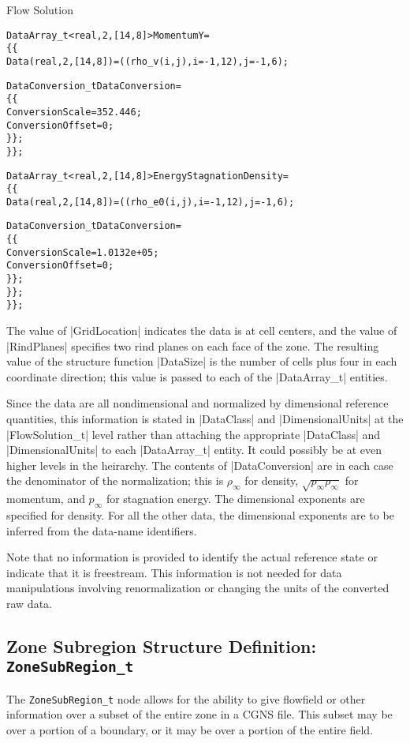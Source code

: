 \begin{example}{Flow Solution}
\begin{alltt}
    DataArray\_t<real, 2, [14,8]> MomentumY =
      \{\{
      Data(real, 2, [14,8]) = ((rho\_v(i,j), i=-1,12), j=-1,6) ;

      DataConversion\_t DataConversion =
        \{\{
        ConversionScale  = 352.446 ;
        ConversionOffset = 0 ;
        \}\} ;
      \}\} ;

    DataArray\_t<real, 2, [14,8]> EnergyStagnationDensity =
      \{\{
      Data(real, 2, [14,8]) = ((rho\_e0(i,j), i=-1,12), j=-1,6) ;

      DataConversion\_t DataConversion =
        \{\{
        ConversionScale  = 1.0132e+05 ;
        ConversionOffset = 0 ;
        \}\} ;
      \}\} ;
    \}\} ;
\end{alltt}
The value of |GridLocation| indicates the data is at cell centers, and the
value of |RindPlanes| specifies two rind planes on each face of the zone.
The resulting value of the structure function |DataSize| is the number of
cells plus four in each coordinate direction; this value is passed to each
of the |DataArray_t| entities.

Since the data are all nondimensional and normalized by dimensional
reference quantities, this information is stated in |DataClass| and 
|DimensionalUnits| at the |FlowSolution_t| level rather than attaching
the appropriate |DataClass| and |DimensionalUnits| to each |DataArray_t|
entity.
It could possibly be at even higher levels in the heirarchy.
The contents of |DataConversion| are in each case the denominator of the
normalization; this is $\rho_\infty$ for density,
$\sqrt{p_\infty \rho_\infty}$ for momentum, and $p_\infty$ for
stagnation energy.
The dimensional exponents are specified for density.
For all the other data, the dimensional exponents are to be inferred from
the data-name identifiers.

Note that no information is provided to identify the actual reference
state or indicate that it is freestream.  This information is not needed
for data manipulations involving renormalization or changing the units
of the converted raw data.
\end{example}

\subsection{Zone Subregion Structure Definition: \texttt{ZoneSubRegion\_t}}
\label{s:ZoneSubRegion}

The \texttt{ZoneSubRegion\_t} node allows for the ability to give flowfield or
other information over a subset of the entire zone in a CGNS file.
This subset may be over a portion of a boundary, or it may be over a portion
of the entire field.

